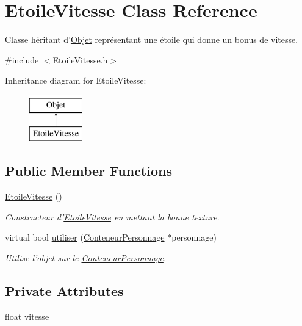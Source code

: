 \hypertarget{classEtoileVitesse}{\section{Etoile\-Vitesse Class Reference}
\label{classEtoileVitesse}
}


Classe héritant d'\hyperlink{classObjet}{Objet} représentant une étoile qui donne un bonus de vitesse.  




{\ttfamily \#include $<$Etoile\-Vitesse.\-h$>$}

Inheritance diagram for Etoile\-Vitesse\-:\begin{figure}[H]
\begin{center}
\leavevmode
\includegraphics[height=2.000000cm]{classEtoileVitesse}
\end{center}
\end{figure}
\subsection*{Public Member Functions}
\begin{DoxyCompactItemize}
\item 
\hypertarget{classEtoileVitesse_a9affe73533c9662b571d29d6d326aad2}{\hyperlink{classEtoileVitesse_a9affe73533c9662b571d29d6d326aad2}{Etoile\-Vitesse} ()}\label{classEtoileVitesse_a9affe73533c9662b571d29d6d326aad2}

\begin{DoxyCompactList}\small\item\em Constructeur d'\hyperlink{classEtoileVitesse}{Etoile\-Vitesse} en mettant la bonne texture. \end{DoxyCompactList}\item 
virtual bool \hyperlink{classEtoileVitesse_adeaf3d5a8e3cffab1e022ad6bc41ca74}{utiliser} (\hyperlink{classConteneurPersonnage}{Conteneur\-Personnage} $\ast$personnage)
\begin{DoxyCompactList}\small\item\em Utilise l'objet sur le \hyperlink{classConteneurPersonnage}{Conteneur\-Personnage}. \end{DoxyCompactList}\end{DoxyCompactItemize}
\subsection*{Private Attributes}
\begin{DoxyCompactItemize}
\item 
float \hyperlink{classEtoileVitesse_a5bbf3f933956a752b980eefb4ca5580b}{vitesse\-\_\-}
\end{DoxyCompactItemize}
